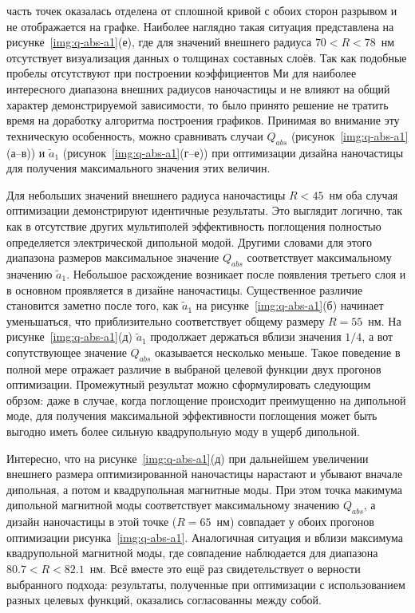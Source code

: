 часть точек оказалась отделена от сплошной кривой с обоих сторон
разрывом и не отображается на графке.  Наиболее наглядно такая
ситуация представлена на рисунке~\ref{img:q-abs-a1}(е), где для
значений внешнего радиуса $70<R<78$~нм отсутствует визуализация данных
о толщинах составных слоёв.  Так как подобные пробелы отсутствуют при
построении коэффициентов Ми для наиболее интересного диапазона внешних
радиусов наночастицы и не влияют на общий характер демонстрируемой
зависимости, то было принято решение не тратить время на доработку
алгоритма построения графиков.  Принимая во внимание эту техническую
особенность, можно сравнивать случаи $Q_{abs}$
(рисунок~\ref{img:q-abs-a1}(а--в)) и $\tilde{a}_1$
(рисунок~\ref{img:q-abs-a1}(г--е)) при оптимизации дизайна наночастицы
для получения максимального значения этих величин.

Для небольших значений внешнего радиуса наночастицы $R<45$~нм оба
случая оптимизации демонстрируют идентичные результаты. Это выглядит
логично, так как в отсутствие других мультиполей эффективность
поглощения полностью определяется электрической дипольной
модой. Другими словами для этого диапазона размеров максимальное
значение $Q_{abs}$ соответствует максимальному значению
$\tilde{a}_1$. Небольшое расхождение возникает после появления
третьего слоя и в основном проявляется в дизайне наночастицы.
Существенное различие становится заметно после того, как $\tilde{a}_1$
на рисунке~\ref{img:q-abs-a1}(б) начинает уменьшаться, что
приблизительно соответствует общему размеру $R=55$~нм. На
рисунке~\ref{img:q-abs-a1}(д) $\tilde{a}_1$ продолжает держаться
вблизи значения $1/4$, а вот сопутствующее значение $Q_{abs}$
оказывается несколько меньше. Такое поведение в полной мере отражает
различие в выбраной целевой функции двух прогонов
оптимизации. Промежутный результат можно сформулировать следующим
обрзом: даже в случае, когда поглощение происходит преимущенно на
дипольной моде, для получения максимальной эффективности поглощения
может быть выгодно иметь более сильную квадрупольную моду в ущерб
дипольной.

Интересно, что на рисунке~\ref{img:q-abs-a1}(д) при дальнейшем
увеличении внешнего размера оптимизированной наночастицы нарастают и
убывают вначале дипольная, а потом и квадрупольная магнитные моды. При
этом точка макимума дипольной магнитной моды соответствует
максимальному значению $Q_{abs}$, а дизайн наночастицы в этой точке
($R=65$~нм) совпадает у обоих прогонов оптимизации
рисунка~\ref{img:q-abs-a1}.  Аналогичная ситуация и вблизи максимума
квадрупольной магнитной моды, где совпадение наблюдается для диапазона
$80.7<R<82.1$~нм.  Всё вместе это ещё раз свидетельствует о верности
выбранного подхода: результаты, полученные при оптимизации с
использованием разных целевых функций, оказались согласованны между
собой.





